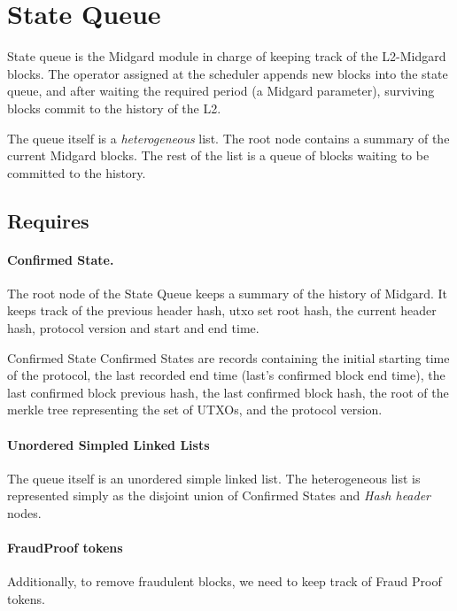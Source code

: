 \section{State Queue}

State queue is the Midgard module in charge of keeping track of the L2-Midgard
blocks.
%
The operator assigned at the scheduler appends new blocks into the state queue,
and after waiting the required period (a Midgard parameter), surviving blocks
commit to the history of the L2.

The queue itself is a \emph{heterogeneous} list.
%
The root node contains a summary of the current Midgard blocks.
%
The rest of the list is a queue of blocks waiting to be committed to the
history.

\subsection{Requires}

\paragraph{Confirmed State.}
%
The root node of the State Queue keeps a summary of the history of Midgard.
%
It keeps track of the previous header hash, utxo set root hash, the current
header hash, protocol version and start and end time.

\begin{definition}{Confirmed State}
  \label{dfn:StateQueue.State.ConfirmedState}
  \leanok
  Confirmed States are records containing the initial starting time of the protocol,
  the last recorded end time (last's confirmed block end time),
  the last confirmed block previous hash,
  the last confirmed block hash,
  the root of the merkle tree representing the set of UTXOs,
  and the protocol version.
\end{definition}

\paragraph{Unordered Simpled Linked Lists}
%
  The queue itself is an unordered simple linked list.
  The heterogeneous list is represented simply as the disjoint union of
  Confirmed States and \emph{Hash header} nodes.

\paragraph{FraudProof tokens}
%
  Additionally, to remove fraudulent blocks, we need to keep track of Fraud
  Proof tokens.

